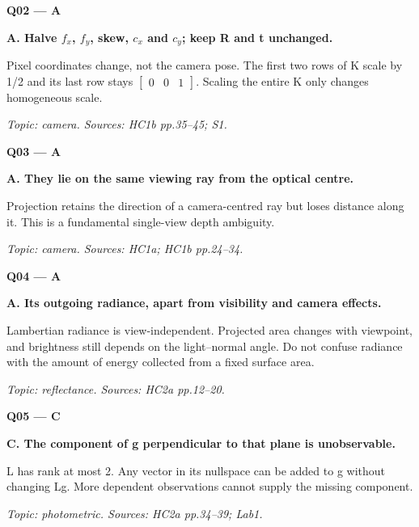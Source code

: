 \documentclass[11pt,a4paper]{article}
\begin{document}
\par\vspace{12pt}
\begin{minipage}{\linewidth}
\textbf{Q02 — A}\par\smallskip
\textbf{A. Halve \(f_x\),\allowbreak{} \(f_y\),\allowbreak{} skew,\allowbreak{} \(c_x\) and \(c_y\); keep R and t unchanged.}\par
Pixel coordinates change,\allowbreak{} not the camera pose. The first two rows of K scale by 1/\allowbreak{}2 and its last row stays \(\begin{bmatrix}0&0&1\end{bmatrix}\). Scaling the entire K only changes homogeneous scale.\par
{\small\itshape Topic: camera. Sources: HC1b pp.35–45; S1.}

\end{minipage}
\par\vspace{12pt}
\begin{minipage}{\linewidth}
\textbf{Q03 — A}\par\smallskip
\textbf{A. They lie on the same viewing ray from the optical centre.}\par
Projection retains the direction of a camera-centred ray but loses distance along it. This is a fundamental single-view depth ambiguity.\par
{\small\itshape Topic: camera. Sources: HC1a; HC1b pp.24–34.}

\end{minipage}
\par\vspace{12pt}
\begin{minipage}{\linewidth}
\textbf{Q04 — A}\par\smallskip
\textbf{A. Its outgoing radiance,\allowbreak{} apart from visibility and camera effects.}\par
Lambertian radiance is view-independent. Projected area changes with viewpoint,\allowbreak{} and brightness still depends on the light–normal angle. Do not confuse radiance with the amount of energy collected from a fixed surface area.\par
{\small\itshape Topic: reflectance. Sources: HC2a pp.12–20.}

\end{minipage}
\par\vspace{12pt}
\begin{minipage}{\linewidth}
\textbf{Q05 — C}\par\smallskip
\textbf{C. The component of g perpendicular to that plane is unobservable.}\par
L has rank at most 2. Any vector in its nullspace can be added to g without changing Lg. More dependent observations cannot supply the missing component.\par
{\small\itshape Topic: photometric. Sources: HC2a pp.34–39; Lab1.}

\end{minipage}
\end{document}
